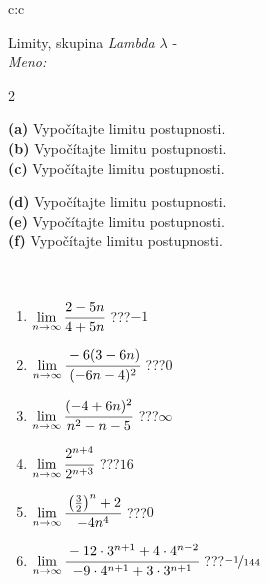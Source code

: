 \documentclass[10pt]{report}
\begin{document}
\newpage
\thispagestyle{empty}
\begin{tabular}{c:c}
\begin{minipage}[c][104.5mm][t]{0.5\linewidth}
\begin{center}
\vspace{5mm}
{\huge Limity, skupina \textit{Lambda $\lambda$} -}\\[5mm]
\textit{Meno:}\phantom{xxxxxxxxxxxxxxxxxxxxxxxxxxxxxxxxxxxxxxxxxxxxxxxxxxxxxxxxxxxxxxxxx}\\[5mm]
\begin{minipage}{0.95\linewidth}
\begin{center}
{\small \begin{multicols}{2} \raggedright
\textbf{(a)} Vypočítajte limitu postupnosti. \\[1mm]
\textbf{(b)} Vypočítajte limitu postupnosti. \\[1mm]
\textbf{(c)} Vypočítajte limitu postupnosti. \par \columnbreak
\textbf{(d)} Vypočítajte limitu postupnosti. \\[1mm]
\textbf{(e)} Vypočítajte limitu postupnosti. \\[1mm]
\textbf{(f)} Vypočítajte limitu postupnosti.
\end{multicols}
}
\end{center}
\end{minipage}
\\[1mm]
\begin{minipage}{0.79\linewidth}
\begin{center}
\begin{varwidth}{\linewidth}
\setlength{\itemsep}{0pt}
\begin{enumerate}
\footnotesizerr
\item $\lim\limits_{n\to\infty}\cfrac{2-5n}{4+5n}$\quad \dotfill\; ???\;\dotfill \quad $-1$
\item $\lim\limits_{n\to\infty}\cfrac{-6(3-6n)}{(-6n-4)^2}$\quad \dotfill\; ???\;\dotfill \quad $0$
\item $\lim\limits_{n\to\infty}\cfrac{(-4+6n)^2}{n^2-n-5}$\quad \dotfill\; ???\;\dotfill \quad $\infty$
\item $\lim\limits_{n\to\infty}\cfrac{2^{n+4}}{2^{n+3}}$\quad \dotfill\; ???\;\dotfill \quad $16$
\item $\lim\limits_{n\to\infty}\cfrac{\left(\frac{3}{2}\right)^n +2}{-4n^{4}}$\quad \dotfill\; ???\;\dotfill \quad $0$
\item $\lim\limits_{n\to\infty}\cfrac{-12\cdot 3^{n+1}+4\cdot 4^{n-2}}{-9\cdot 4^{n+1}+3\cdot 3^{n+1}}$\quad \dotfill\; ???\;\dotfill \quad $\nicefrac{-1}{144}$

\end{enumerate}
\end{varwidth}
\end{center}
\end{minipage}
\end{center}
\end{minipage}
\end{tabular}
\end{document}

